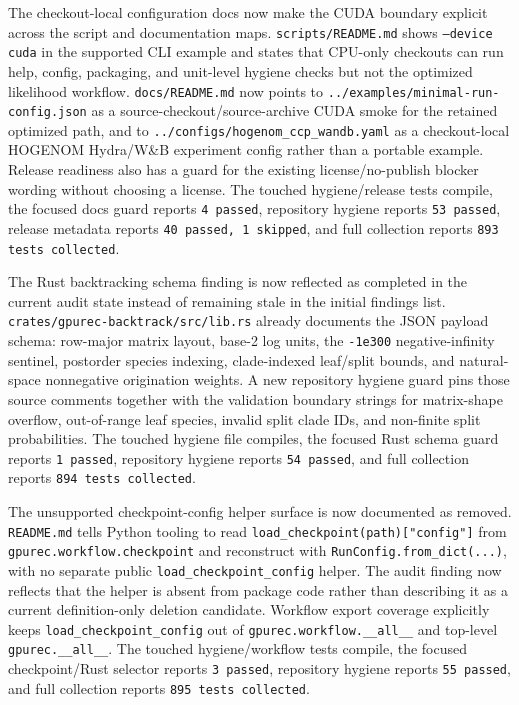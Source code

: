 \documentclass[11pt]{article}
\begin{document}
The checkout-local configuration docs now make the CUDA boundary explicit
across the script and documentation maps.  \texttt{scripts/README.md} shows
\texttt{--device cuda} in the supported CLI example and states that CPU-only
checkouts can run help, config, packaging, and unit-level hygiene checks but not
the optimized likelihood workflow.  \texttt{docs/README.md} now points to
\texttt{../examples/minimal-run-config.json} as a source-checkout/source-archive
CUDA smoke for the retained optimized path, and to
\texttt{../configs/hogenom\_ccp\_wandb.yaml} as a checkout-local HOGENOM
Hydra/W\&B experiment config rather than a portable example.  Release readiness
also has a guard for the existing license/no-publish blocker wording without
choosing a license.  The touched hygiene/release tests compile, the focused
docs guard reports \texttt{4 passed}, repository hygiene reports
\texttt{53 passed}, release metadata reports \texttt{40 passed, 1 skipped}, and
full collection reports \texttt{893 tests collected}.

The Rust backtracking schema finding is now reflected as completed in the
current audit state instead of remaining stale in the initial findings list.
\texttt{crates/gpurec-backtrack/src/lib.rs} already documents the JSON payload
schema: row-major matrix layout, base-2 log units, the \texttt{-1e300}
negative-infinity sentinel, postorder species indexing, clade-indexed
leaf/split bounds, and natural-space nonnegative origination weights.  A new
repository hygiene guard pins those source comments together with the
validation boundary strings for matrix-shape overflow, out-of-range leaf
species, invalid split clade IDs, and non-finite split probabilities.  The
touched hygiene file compiles, the focused Rust schema guard reports
\texttt{1 passed}, repository hygiene reports \texttt{54 passed}, and full
collection reports \texttt{894 tests collected}.

The unsupported checkpoint-config helper surface is now documented as removed.
\texttt{README.md} tells Python tooling to read
\texttt{load\_checkpoint(path)["config"]} from
\texttt{gpurec.workflow.checkpoint} and reconstruct with
\texttt{RunConfig.from\_dict(...)}, with no separate public
\texttt{load\_checkpoint\_config} helper.  The audit finding now reflects that
the helper is absent from package code rather than describing it as a current
definition-only deletion candidate.  Workflow export coverage explicitly keeps
\texttt{load\_checkpoint\_config} out of \texttt{gpurec.workflow.\_\_all\_\_}
and top-level \texttt{gpurec.\_\_all\_\_}.  The touched hygiene/workflow tests
compile, the focused checkpoint/Rust selector reports \texttt{3 passed},
repository hygiene reports \texttt{55 passed}, and full collection reports
\texttt{895 tests collected}.
\end{document}
